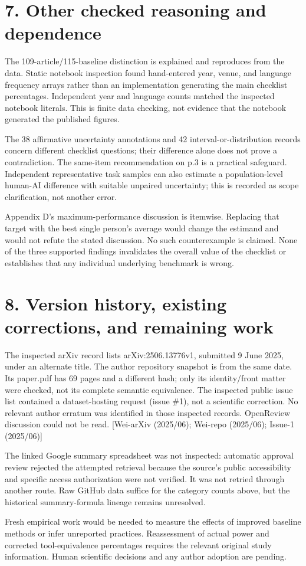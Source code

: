 \documentclass[10pt]{article}
\begin{document}
\section*{7. Other checked reasoning and dependence}
The 109-article/115-baseline distinction is explained and reproduces from the data. Static notebook inspection found hand-entered year, venue, and language frequency arrays rather than an implementation generating the main checklist percentages. Independent year and language counts matched the inspected notebook literals. This is finite data checking, not evidence that the notebook generated the published figures.\par
The 38 affirmative uncertainty annotations and 42 interval-or-distribution records concern different checklist questions; their difference alone does not prove a contradiction. The same-item recommendation on p.3 is a practical safeguard. Independent representative task samples can also estimate a population-level human-AI difference with suitable unpaired uncertainty; this is recorded as scope clarification, not another error.\par
Appendix D’s maximum-performance discussion is itemwise. Replacing that target with the best single person’s average would change the estimand and would not refute the stated discussion. No such counterexample is claimed. None of the three supported findings invalidates the overall value of the checklist or establishes that any individual underlying benchmark is wrong.\par
\section*{8. Version history, existing corrections, and remaining work}
The inspected arXiv record lists arXiv:2506.13776v1, submitted 9 June 2025, under an alternate title. The author repository snapshot is from the same date. Its paper.pdf has 69 pages and a different hash; only its identity/front matter were checked, not its complete semantic equivalence. The inspected public issue list contained a dataset-hosting request (issue \#1), not a scientific correction. No relevant author erratum was identified in those inspected records. OpenReview discussion could not be read. [Wei-arXiv (2025/06); Wei-repo (2025/06); Issue-1 (2025/06)]\par
The linked Google summary spreadsheet was not inspected: automatic approval review rejected the attempted retrieval because the source’s public accessibility and specific access authorization were not verified. It was not retried through another route. Raw GitHub data suffice for the category counts above, but the historical summary-formula lineage remains unresolved.\par
Fresh empirical work would be needed to measure the effects of improved baseline methods or infer unreported practices. Reassessment of actual power and corrected tool-equivalence percentages requires the relevant original study information. Human scientific decisions and any author adoption are pending.\par
\end{document}
